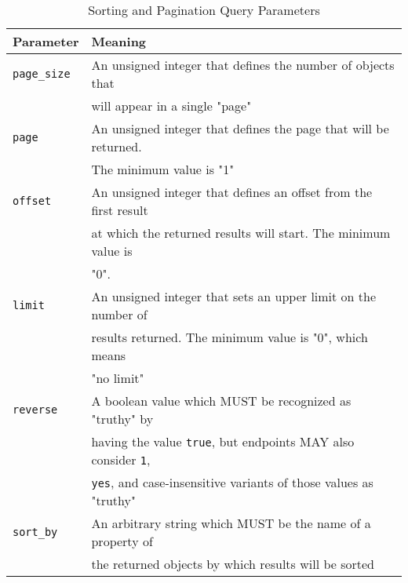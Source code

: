 \documentclass{article}
\newcommand{\code}[1]{\texttt{\color{inlinecodecolor}#1}}
\begin{document}
\begin{table}[h]
\caption{Sorting and Pagination Query Parameters\label{tbl:pag-and-sort-qparams}}
\begin{tabular}{|l|l|}
\hline
\textbf{Parameter} & \textbf{Meaning}\\
\hline
\code{page\_size} & An unsigned integer that defines the number of objects that\\
                  & will appear in a single "page"\\
\hline
\code{page}       & An unsigned integer that defines the page that will be returned.\\
                  & The minimum value is "1"\\
\hline
\code{offset}     & An unsigned integer that defines an offset from the first result\\
                  & at which the returned results will start. The minimum value is\\
                  & "0".\\
\hline
\code{limit}      & An unsigned integer that sets an upper limit on the number of\\
                  & results returned. The minimum value is "0", which means\\
                  & "no limit"\\
\hline
\code{reverse}    & A boolean value which MUST be recognized as "truthy" by\\
                  & having the value \code{true}, but endpoints MAY also consider \code{1},\\
                  & \code{yes}, and case-insensitive variants of those values as "truthy"\\
\hline
\code{sort\_by}   & An arbitrary string which MUST be the name of a property of\\
                  & the returned objects by which results will be sorted\\
\hline
\end{tabular}
\end{table}
\end{document}
